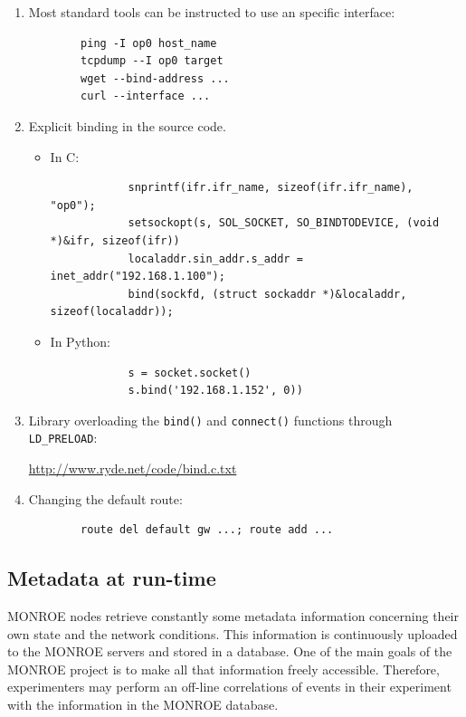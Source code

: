 \documentclass[a4paper,10pt]{article}
\newcommand{\VerbatimFont}{\footnotesize}
\newcommand{\monroe}{MONROE}
\newcommand{\identifier}[1]{{\texttt{\small{#1}}}}
\begin{document}
\begin{enumerate}
	\item Most standard tools can be instructed to use an specific interface:
	{	\VerbatimFont
		\begin{verbatim}
		ping -I op0 host_name
		tcpdump --I op0 target
		wget --bind-address ...
		curl --interface ...
		\end{verbatim}
	}
	
	\item Explicit binding in the source code.
	\begin{itemize}
		\item In C:
		{
			\VerbatimFont
			\begin{verbatim}
			snprintf(ifr.ifr_name, sizeof(ifr.ifr_name), "op0");
			setsockopt(s, SOL_SOCKET, SO_BINDTODEVICE, (void *)&ifr, sizeof(ifr))
			localaddr.sin_addr.s_addr = inet_addr("192.168.1.100");
			bind(sockfd, (struct sockaddr *)&localaddr, sizeof(localaddr));
			\end{verbatim}
		}
		\item In Python:
		{
			\VerbatimFont
			\begin{verbatim}
			s = socket.socket()
			s.bind('192.168.1.152', 0))
			\end{verbatim}
		}
	\end{itemize}
	
	\item Library overloading the \identifier{bind()} and \identifier{connect()} functions through \identifier{LD\_PRELOAD}:
	
	\url{http://www.ryde.net/code/bind.c.txt}
	
	\item Changing the default route:
	{
		\VerbatimFont
		\begin{verbatim}
		route del default gw ...; route add ...
		\end{verbatim}
	}
\end{enumerate}


\subsection{Metadata at run-time}
\label{subsec:metadataRunTime}

\monroe{} nodes retrieve constantly some metadata information concerning their own state and the network conditions.
This information is continuously uploaded to the \monroe{} servers and stored in a database.
One of the main goals of the \monroe{} project is to make all that information freely accessible.
Therefore, experimenters may perform an off-line correlations of events in their experiment with the information in the \monroe{} database.
\end{document}
